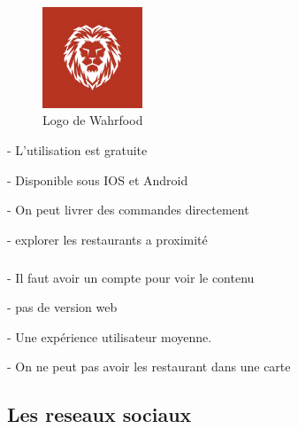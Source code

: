 \subparagraph*{}
\begin{figure}
	\vspace{-15pt}
	\begin{flushright}
\includegraphics[width=3cm]{images/Chapitre1/wahrfood.jpg}
	\end{flushright}
    \vspace{-20pt}
    \caption{{\footnotesize Logo de Wahrfood}}
\end{figure}
\begin{list}{•}{\textbf{Avantages}}
	\item - L'utilisation est gratuite 
	\item - Disponible sous IOS et Android 
	\item - On peut livrer des commandes directement 
	\item - explorer les restaurants a proximité
	
\end{list}

\subparagraph*{}
\begin{list}{•}{\textbf{Inconvénients}}
	\item - Il faut avoir un compte pour voir le contenu 
	\item - pas de version web 
	\item - Une expérience utilisateur moyenne.
	\item - On ne peut pas avoir les restaurant dans une carte
   
\end{list}

\newpage
\subsection{Les reseaux sociaux }

